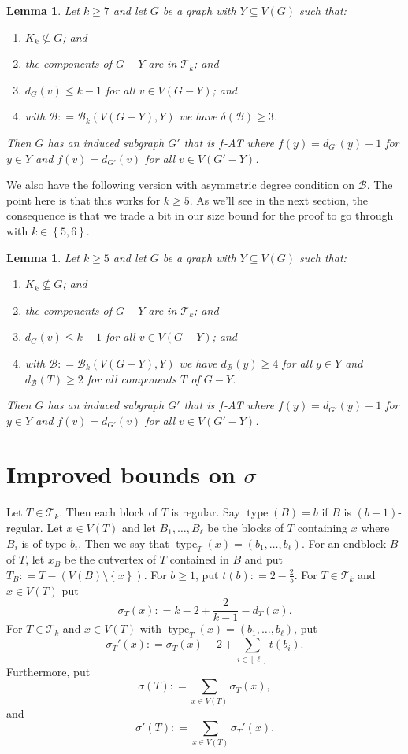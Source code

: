 \documentclass[12pt]{article}
\theoremstyle{plain}
\newtheorem{lem}[thm]{Lemma}
\theoremstyle{definition}
\theoremstyle{remark}
\newcommand{\fancy}[1]{\mathcal{#1}}
\newcommand{\T}{\fancy{T}}
\newcommand{\B}{\fancy{B}}
\newcommand{\set}[1]{\left\{ #1 \right\}}
\newcommand{\irange}[1]{\left[#1\right]}
\newcommand{\parens}[1]{\left( #1 \right)}
\newcommand{\DefinedAs}{\mathrel{\mathop:}=}
\newcommand{\type}{\operatorname{type}}
\begin{document}
\begin{lem}
	\label{MultipleHighConfigurationEuler} Let $k\ge7$ and let $G$ be a graph with
	$Y\subseteq V(G)$ such that: 
	\begin{enumerate}
		\item $K_{k}\not\subseteq G$; and 
		\item the components of $G-Y$ are in $\T_{k}$; and 
		\item $d_{G}(v)\leq k-1$ for all $v\in V(G-Y)$; and 
		\item with $\B\DefinedAs\B_{k}(V(G-Y),Y)$ we have $\delta(\B)\ge3$. 
	\end{enumerate}
	\noindent Then $G$ has an induced subgraph $G'$ that is $f$-AT where $f(y)=d_{G'}(y)-1$
	for $y\in Y$ and $f(v)=d_{G'}(v)$ for all $v\in V(G'-Y)$.\end{lem}

We also have the following version with asymmetric degree condition on $\B$.  The point here is that this works for $k \ge 5$.  As we'll see in the next section, the consequence is that we trade a bit in our size bound for the proof to go through with $k \in \set{5,6}$.

\begin{lem}
	\label{MultipleHighConfigurationEulerLopsided} Let $k \ge 5$ and let $G$ be a graph with
	$Y\subseteq V(G)$ such that: 
	\begin{enumerate}
		\item $K_{k}\not\subseteq G$; and 
		\item the components of $G-Y$ are in $\T_{k}$; and 
		\item $d_{G}(v)\leq k-1$ for all $v\in V(G-Y)$; and 
		\item with $\B \DefinedAs \B_k(V(G-Y), Y)$ we have $d_{\B}(y) \ge 4$ for all $y \in Y$ and $d_{\B}(T) \ge 2$ for all components $T$ of $G-Y$.
	\end{enumerate}
	\noindent Then $G$ has an induced subgraph $G'$ that is $f$-AT where $f(y)=d_{G'}(y)-1$
	for $y\in Y$ and $f(v)=d_{G'}(v)$ for all $v\in V(G'-Y)$.\end{lem}

\section{Improved bounds on $\sigma$}
Let $T \in \T_k$.  Then each block of $T$ is regular. Say $\type(B) = b$ if $B$ is $(b-1)$-regular.  Let $x \in V(T)$ and let $B_1, \ldots, B_{\ell}$ be the blocks of $T$ containing $x$ where $B_i$ is of type $b_i$.  Then we say that $\type_T(x) = (b_1,\ldots,b_{\ell})$.  For an endblock $B$ of $T$, let $x_B$ be the cutvertex of $T$ contained in $B$ and put $T_B \DefinedAs T - \parens{V(B) \setminus \set{x}}$.  For $b \ge 1$, put $t(b) \DefinedAs 2 - \frac{2}{b}$.   For $T \in \T_k$ and $x \in V(T)$ put
\[\sigma_T(x) \DefinedAs k - 2 + \frac{2}{k-1} - d_T(x).\]
For $T \in \T_k$ and $x \in V(T)$ with $\type_T(x) = (b_1,\ldots, b_{\ell})$, put
\[\sigma_T'(x) \DefinedAs \sigma_T(x) - 2 + \sum_{i \in \irange{\ell}}t(b_i).\]
Furthermore, put
\[\sigma(T) \DefinedAs \sum_{x \in V(T)} \sigma_T(x),\]
and
\[\sigma'(T) \DefinedAs \sum_{x \in V(T)} \sigma_T'(x).\]
\end{document}
